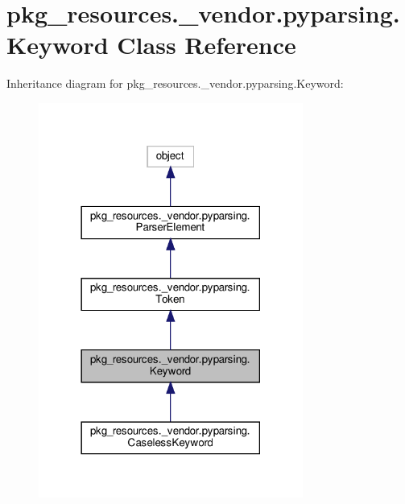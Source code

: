 \hypertarget{classpkg__resources_1_1__vendor_1_1pyparsing_1_1Keyword}{}\section{pkg\+\_\+resources.\+\_\+vendor.\+pyparsing.\+Keyword Class Reference}
\label{classpkg__resources_1_1__vendor_1_1pyparsing_1_1Keyword}


Inheritance diagram for pkg\+\_\+resources.\+\_\+vendor.\+pyparsing.\+Keyword\+:
\nopagebreak
\begin{figure}[H]
\begin{center}
\leavevmode
\includegraphics[width=246pt]{classpkg__resources_1_1__vendor_1_1pyparsing_1_1Keyword__inherit__graph}
\end{center}
\end{figure}


